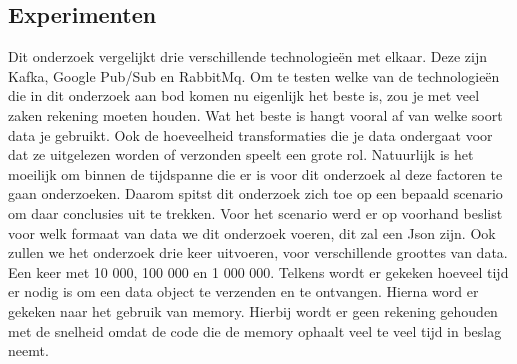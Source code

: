 \documentclass[a0,portrait]{a0poster}
\begin{document}
\begin{multicols}{2}
\section*{Experimenten}
\color{black}
Dit onderzoek vergelijkt drie verschillende technologieën met elkaar. Deze zijn Kafka, Google Pub/Sub en RabbitMq. Om te testen welke van de technologieën die in dit onderzoek aan bod komen nu eigenlijk het beste is, zou je met veel zaken rekening moeten houden. Wat het beste is hangt vooral af van welke soort data je gebruikt. Ook de hoeveelheid transformaties die je data ondergaat voor dat ze uitgelezen worden of verzonden speelt een grote rol. Natuurlijk is het moeilijk om binnen de tijdspanne die er is voor dit onderzoek al deze factoren te gaan onderzoeken. Daarom spitst dit onderzoek zich toe op een bepaald scenario om daar conclusies uit te trekken. Voor het scenario werd er op voorhand beslist voor welk formaat van data we dit onderzoek voeren, dit zal een Json zijn. Ook zullen we het onderzoek drie keer uitvoeren, voor verschillende groottes van data. Een keer met 10 000, 100 000 en 1 000 000. Telkens wordt er gekeken hoeveel tijd er nodig is om een data object te verzenden en te ontvangen. Hierna word er gekeken naar het gebruik van memory. Hierbij wordt er geen rekening gehouden met de snelheid omdat de code die de memory ophaalt veel te veel tijd in beslag neemt.


\end{multicols}
\end{document}
